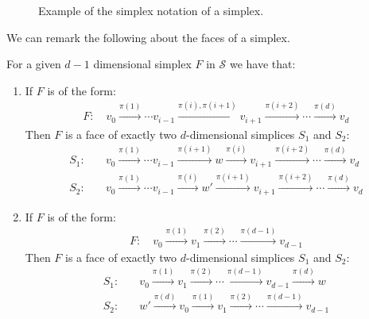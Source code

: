 \begin{figure}
	\centering
	{\large{}}
	\caption[Example of the simplex Notation]{Example of the simplex notation of a simplex.}\label{fig:simplex_notation_example}
\end{figure}

We can remark the following about the faces of a simplex.
\begin{remark}\label{rem:faces_of_simplex}
	For a given $d-1$ dimensional simplex $F$ in $\mathcal{S}$ we have that:
	\begin{enumerate}
		\item If $F$ is of the form:
		      \begin{align*}
			      F: \quad v_0 \xrightarrow{\pi(1)}  \cdots v_{i-1} \xrightarrow{\pi(i), \pi(i+1)} v_{i+1} \xrightarrow{\pi(i+2)} \cdots \xrightarrow{\pi(d)} v_d
		      \end{align*}
		      Then $F$ is a face of exactly two $d$-dimensional simplices $S_1$ and $S_2$:
		      \begin{align*}
			      S_1: \quad & v_0 \xrightarrow{\pi(1)} \cdots v_{i-1} \xrightarrow{\pi(i+1)} w \xrightarrow{\pi(i)} v_{i + 1} \xrightarrow{\pi(i+2)} \cdots \xrightarrow{\pi(d)} v_d  \\
			      S_2: \quad & v_0 \xrightarrow{\pi(1)} \cdots v_{i-1} \xrightarrow{\pi(i)} w' \xrightarrow{\pi(i+1)} v_{i + 1} \xrightarrow{\pi(i+2)} \cdots \xrightarrow{\pi(d)} v_d
		      \end{align*}\label{rem:face_inside_cell}
		\item If $F$ is of the form:
		      \begin{align*}
			      F: \quad v_0 \xrightarrow{\pi(1)} v_1 \xrightarrow{\pi(2)} \cdots \xrightarrow{\pi(d-1)} v_{d-1}
		      \end{align*}
		      Then $F$ is a face of exactly two $d$-dimensional simplices $S_1$ and $S_2$:
		      \begin{align*}
			      S_1: & \quad v_0 \xrightarrow{\pi(1)} v_1 \xrightarrow{\pi(2)} \cdots \xrightarrow{\pi(d-1)} v_{d-1} \xrightarrow{\pi(d)} w  \\
			      S_2: & \quad w' \xrightarrow{\pi(d)} v_0 \xrightarrow{\pi(1)} v_1 \xrightarrow{\pi(2)} \cdots \xrightarrow{\pi(d-1)} v_{d-1} \\
		      \end{align*}\label{rem:face_border_cell}
	\end{enumerate}
\end{remark}

